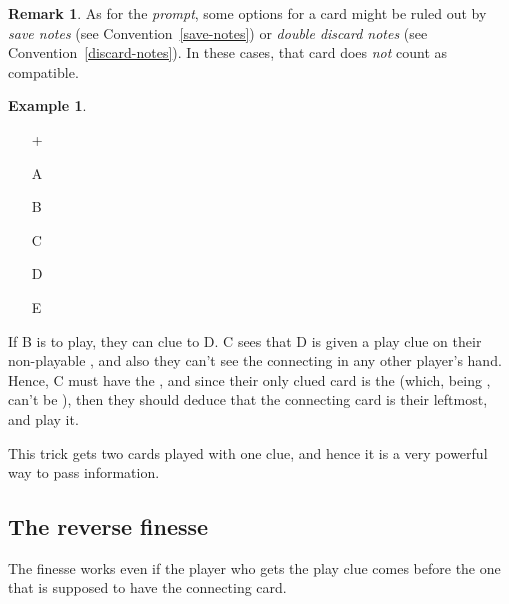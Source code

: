 \documentclass[a4paper]{article}
\theoremstyle{plain}
\theoremstyle{definition}
\newtheorem{remark}[theorem]{Remark}
\newtheorem{example}[theorem]{Example}
\begin{document}
\begin{remark}
	As for the \emph{prompt}, some options for a card might be ruled out by \emph{save notes} (see Convention~\ref{save-notes}) or \emph{double discard notes} (see Convention~\ref{discard-notes}). In these cases, that card does \emph{not} count as compatible.
\end{remark}

\begin{example} \hfill \\
	\begin{minipage}{0.45\textwidth}
		\begin{itemize}
			\item[\Large +]      
			\item[\Large A]    
			\item[\Large B]    
			\item[\Large C]    
			\item[\Large D]    
			\item[\Large E]    
		\end{itemize}
	\end{minipage}%
	\begin{minipage}{0.55\textwidth}
		If B is to play, they can clue  to D. C sees that D is given a play clue on their non-playable , and also they can't see the connecting  in any other player's hand. Hence, C must have the , and since their only clued card is the  (which, being , can't be ), then they should deduce that the connecting card is their leftmost, and play it.
	\end{minipage}
\end{example} \vspace{0.15 cm}

This trick gets two cards played with one clue, and hence it is a very powerful way to pass information.

\subsection{The reverse finesse}

The finesse works even if the player who gets the play clue comes before the one that is supposed to have the connecting card. 
\end{document}

